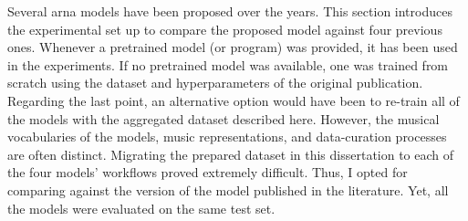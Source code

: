 
Several \gls{arna} models have been proposed over the years.
This section introduces the experimental set up to compare
the proposed model against four previous ones. Whenever a
pretrained model (or program) was provided, it has been used
in the experiments. If no pretrained model was available,
one was trained from scratch using the dataset and
hyperparameters of the original publication. Regarding the
last point, an alternative option would have been to
re-train all of the models with the aggregated dataset
described here. However, the musical vocabularies of the
models, music representations, and data-curation processes
are often distinct. Migrating the prepared dataset in this
dissertation to each of the four models' workflows proved
extremely difficult. Thus, I opted for comparing against the
version of the model published in the literature. Yet, all
the models were evaluated on the same test set.
